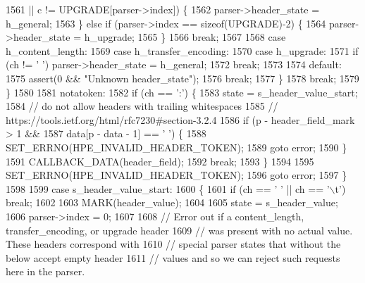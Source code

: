 \begin{DoxyCode}
1561                   || c != UPGRADE[parser->index]) \{
1562                 parser->header_state = h_general;
1563               \} \textcolor{keywordflow}{else} \textcolor{keywordflow}{if} (parser->index == \textcolor{keyword}{sizeof}(UPGRADE)-2) \{
1564                 parser->header_state = h_upgrade;
1565               \}
1566               \textcolor{keywordflow}{break};
1567 
1568             \textcolor{keywordflow}{case} h_content_length:
1569             \textcolor{keywordflow}{case} h_transfer_encoding:
1570             \textcolor{keywordflow}{case} h_upgrade:
1571               \textcolor{keywordflow}{if} (ch != \textcolor{charliteral}{' '}) parser->header_state = h_general;
1572               \textcolor{keywordflow}{break};
1573 
1574             \textcolor{keywordflow}{default}:
1575               assert(0 && \textcolor{stringliteral}{"Unknown header\_state"});
1576               \textcolor{keywordflow}{break};
1577           \}
1578           \textcolor{keywordflow}{break};
1579         \}
1580 
1581         notatoken:
1582         \textcolor{keywordflow}{if} (ch == \textcolor{charliteral}{':'}) \{
1583           state = s_header_value_start;
1584           \textcolor{comment}{// do not allow headers with trailing whitespaces}
1585           \textcolor{comment}{// https://tools.ietf.org/html/rfc7230#section-3.2.4}
1586           \textcolor{keywordflow}{if} (p - header\_field\_mark > 1 &&
1587               data[p - data - 1] == \textcolor{charliteral}{' '}) \{
1588             SET_ERRNO(HPE_INVALID_HEADER_TOKEN);
1589             \textcolor{keywordflow}{goto} error;
1590           \}
1591           CALLBACK_DATA(header\_field);
1592           \textcolor{keywordflow}{break};
1593         \}
1594 
1595         SET_ERRNO(HPE_INVALID_HEADER_TOKEN);
1596         \textcolor{keywordflow}{goto} error;
1597       \}
1598 
1599       \textcolor{keywordflow}{case} s_header_value_start:
1600       \{
1601         \textcolor{keywordflow}{if} (ch == \textcolor{charliteral}{' '} || ch == \textcolor{charliteral}{'\(\backslash\)t'}) \textcolor{keywordflow}{break};
1602 
1603         MARK(header\_value);
1604 
1605         state = s_header_value;
1606         parser->index = 0;
1607 
1608         \textcolor{comment}{// Error out if a content\_length, transfer\_encoding, or upgrade header}
1609         \textcolor{comment}{// was present with no actual value.  These headers correspond with}
1610         \textcolor{comment}{// special parser states that without the below accept empty header}
1611         \textcolor{comment}{// values and so we can reject such requests here in the parser.}

\end{DoxyCode}
